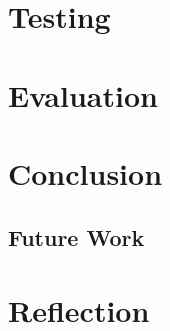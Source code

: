 \documentclass[11pt]{book}
\begin{document}
\chapter{Testing}

\chapter{Evaluation}

\chapter{Conclusion}


\section{Future Work}

\chapter{Reflection}

\printbibliography
\end{document}

